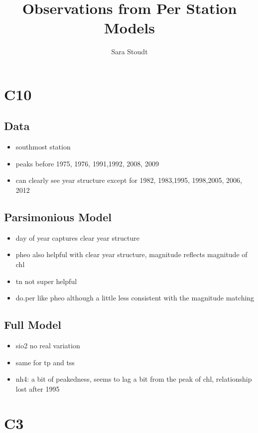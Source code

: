 \documentclass[12pt]{amsart}
\title{Observations from Per Station Models}
\author{Sara Stoudt}
\begin{document}
\maketitle

\section{C10}
\subsection{Data}
\begin{itemize}
\item southmost station
\item peaks before 1975, 1976, 1991,1992, 2008, 2009
\item can clearly see year structure except for 1982, 1983,1995, 1998,2005, 2006, 2012
\end{itemize}

\subsection{Parsimonious Model}

\begin{itemize}
\item day of year captures clear year structure
\item pheo also helpful with clear year structure, magnitude reflects magnitude of chl
\item tn not super helpful
\item do.per like pheo although a little less consistent with the magnitude matching
\end{itemize}

\subsection{Full Model}

\begin{itemize}
\item sio2 no real variation 
\item same for tp and tss
\item nh4: a bit of peakedness, seems to lag a bit from the peak of chl, relationship lost after 1995

\end{itemize}

\section{C3}
\end{document}
